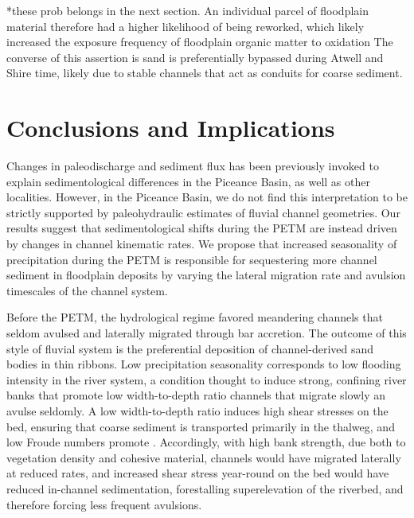 \documentclass[draft]{compact_proposal}
\begin{document}
*these prob belongs in the next section.
  An individual parcel of floodplain material therefore had a higher likelihood of being reworked, which likely increased the exposure frequency of floodplain organic matter to oxidation
  The converse of this assertion is sand is preferentially bypassed during Atwell and Shire time, likely due to stable channels that act as conduits for coarse sediment.

\section{Conclusions and Implications}

Changes in paleodischarge and sediment flux has been previously invoked to explain sedimentological differences in the Piceance Basin, as well as other localities.
However, in the Piceance Basin, we do not find this interpretation to be strictly supported by paleohydraulic estimates of fluvial channel geometries.
Our results suggest that sedimentological shifts during the PETM are instead driven by changes in channel kinematic rates.
We propose that increased seasonality of precipitation during the PETM is responsible for sequestering more channel sediment in floodplain deposits by varying the lateral migration rate and avulsion timescales of the channel system.

Before the PETM, the  hydrological regime favored meandering channels that seldom avulsed and laterally migrated through bar accretion.
The outcome of this style of fluvial system is the preferential deposition of channel-derived sand bodies in thin ribbons.
Low precipitation seasonality corresponds to low flooding intensity in the river system, a condition thought to induce strong, confining river banks that promote low width-to-depth ratio channels that migrate slowly an avulse seldomly.
A low width-to-depth ratio induces high shear stresses on the bed, ensuring that coarse sediment is transported primarily in the thalweg, and low Froude numbers promote \pnote[something].
Accordingly, with high bank strength, due both to vegetation density and cohesive material, channels would have migrated laterally at reduced rates, and increased shear stress year-round on the bed would have reduced in-channel sedimentation, forestalling superelevation of the riverbed, and therefore forcing less frequent avulsions.
\end{document}
